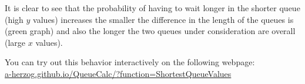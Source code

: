 \documentclass[a4paper,11pt,oneside]{article}
\begin{document}
It is clear to see that the probability of having to wait longer in the shorter queue (high $y$ values) increases the smaller the difference in the length of the queues is (green graph) and also the longer the two queues under consideration are overall (large $x$ values).

You can try out this behavior interactively on the following webpage:\\
\href{https://a-herzog.github.io/QueueCalc/?function=ShortestQueueValues}{a-herzog.github.io/QueueCalc/?function=ShortestQueueValues}
\end{document}
